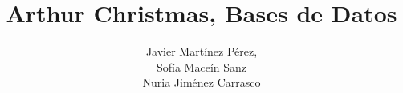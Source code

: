 \documentclass[a4paper, 11pt]{article}
\author{Javier Martínez Pérez, \\Sofía Maceín Sanz \\Nuria Jiménez Carrasco}
\title{Arthur Christmas, Bases de Datos}
\begin{document}
\maketitle

\theoremstyle{definition}
\newtheorem*{proy}{Arthur Christmas}
\newtheorem*{hipad}{Hipótesis adicionales}
\newtheorem*{noinc}{Requisitos no incluidos en el esquema}


\newcommand{\C}{\mathbb{C}}
\newcommand{\R}{\mathbb{R}}
\newcommand{\Q}{\mathbb{Q}}
\newcommand{\Z}{\mathbb{Z}}
\newcommand{\N}{\mathbb{N}}
\newcommand{\F}{\mathbb{F}}
\newcommand{\pmin}{m_{\alpha, K}}

\newcommand\restr[2]{{
  \left.\kern-\nulldelimiterspace 
  #1 %
  \vphantom{\big|} 
  \right|_{#2} 
  }}
\end{document}
